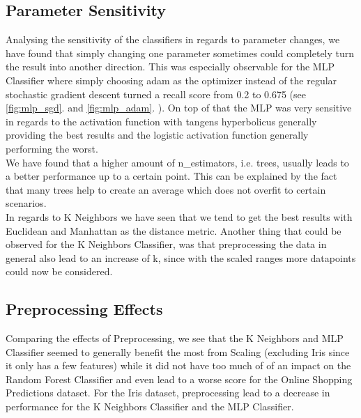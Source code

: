 \documentclass{article}
\newcommand{\secref}[1]{\autoref{#1}. \textit{\nameref{#1}}}
\begin{document}
\subsection{Parameter Sensitivity}
Analysing the sensitivity of the classifiers in regards to parameter changes, we have found that simply changing one parameter sometimes could completely turn the result into another direction. This was especially observable for the MLP Classifier where simply choosing adam as the optimizer instead of the regular stochastic gradient descent turned a recall score from 0.2 to 0.675 (see \secref{fig:mlp_sgd} and \secref{fig:mlp_adam}). On top of that the MLP was very sensitive in regards to the activation function with tangens hyperbolicus generally providing the best results and the logistic activation function generally performing the worst.\\
We have found that a higher amount of n\_estimators, i.e. trees, usually leads to a better performance up to a certain point. This can be explained by the fact that many trees help to create an average which does not overfit to certain scenarios.\\
In regards to K Neighbors we have seen that we tend to get the best results with Euclidean and Manhattan as the distance metric.  
Another thing that could be observed for the K Neighbors Classifier, was that preprocessing the data in general also lead to an increase of k, since with the scaled ranges  more datapoints could now be considered. \\
\newline
\subsection{Preprocessing Effects}
Comparing the effects of Preprocessing, we see that the K Neighbors and MLP Classifier seemed to generally benefit the most from Scaling (excluding Iris since it only has a few features) while it did not have too much of of an impact on the Random Forest Classifier and even lead to a worse score for the Online Shopping Predictions dataset. For the Iris dataset, preprocessing lead to a decrease in performance for the K Neighbors Classifier and the MLP Classifier.
\end{document}
